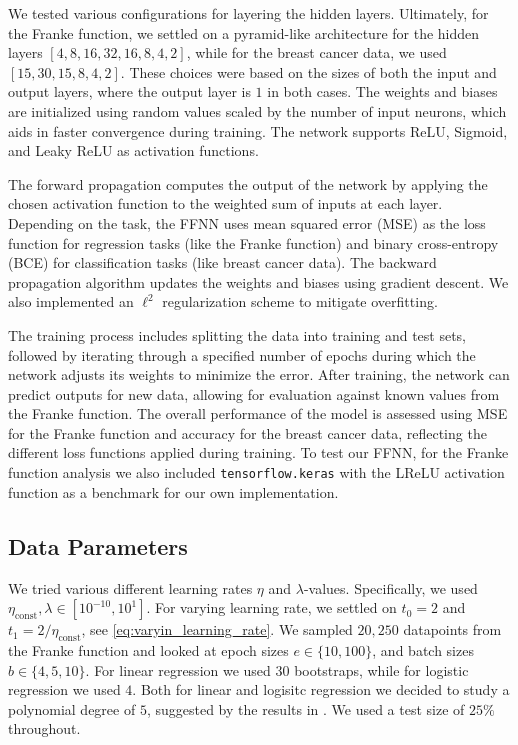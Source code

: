 \documentclass[%
reprint,s
amsmath,amssymb,
aps,
]{revtex4-2}
\begin{document}
We tested various configurations for layering the hidden layers. Ultimately, for the Franke function, we settled on a pyramid-like architecture for the hidden layers \([4,8,16,32,16,8,4,2]\), while for the breast cancer data, we used \([15,30,15,8,4,2]\). These choices were based on the sizes of both the input and output layers, where the output layer is \(1\) in both cases. The weights and biases are initialized using random values scaled by the number of input neurons, which aids in faster convergence during training. The network supports ReLU, Sigmoid, and Leaky ReLU as activation functions. 

The forward propagation computes the output of the network by applying the chosen activation function to the weighted sum of inputs at each layer. Depending on the task, the FFNN uses mean squared error (MSE) as the loss function for regression tasks (like the Franke function) and binary cross-entropy (BCE) for classification tasks (like breast cancer data). The backward propagation algorithm updates the weights and biases using gradient descent. We also implemented an $\ell^2$ regularization scheme to mitigate overfitting.

The training process includes splitting the data into training and test sets, followed by iterating through a specified number of epochs during which the network adjusts its weights to minimize the error. After training, the network can predict outputs for new data, allowing for evaluation against known values from the Franke function. The overall performance of the model is assessed using MSE for the Franke function and accuracy for the breast cancer data, reflecting the different loss functions applied during training. To test our FFNN, for the Franke function analysis we also included \texttt{tensorflow.keras} with the LReLU activation function as a benchmark for our own implementation.

\subsection{Data Parameters}
We tried various different learning rates \(\eta\) and \(\lambda\)-values. Specifically, we used \(\eta_{\text{const}}, \lambda \in[10^{-10}, 10^{1}]\). For varying learning rate, we settled on \(t_0=2\) and \(t_{1} = 2 / \eta_{\text{const}} \), see \eqref{eq:varyin_learning_rate}. We sampled \(20, 250\) datapoints from the Franke function and looked at epoch sizes \(e \in \{10, 100\}\), and batch sizes \(b\in\{4, 5, 10\}\). For linear regression we used \(30\) bootstraps, while for logistic regression we used \(4\). Both for linear and logisitc regression we decided to study a polynomial degree of \(5\), suggested by the results in \cite{project1}. We used a test size of \(25\%\) throughout. 
\end{document}
